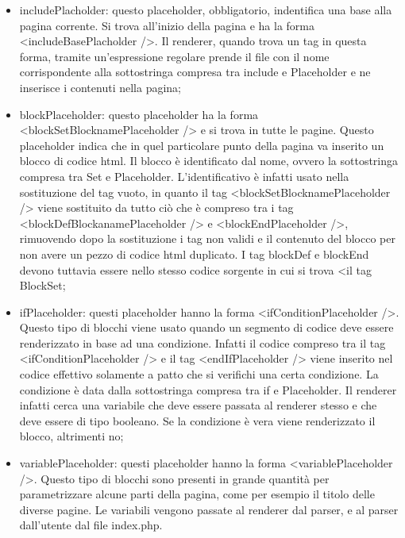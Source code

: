 \begin{itemize}
    
	\item includePlacholder: questo placeholder, obbligatorio, indentifica una base alla pagina corrente. Si trova all'inizio della pagina e ha la forma <includeBasePlacholder />. Il renderer, quando trova un tag in questa forma, tramite un'espressione
	regolare prende il file con il nome corrispondente alla sottostringa compresa tra include e Placeholder e ne inserisce i contenuti nella pagina;
	
    \item blockPlaceholder: questo placeholder ha la forma <blockSetBlocknamePlaceholder /> e si trova in tutte le pagine. Questo placeholder indica che in quel particolare punto della pagina va inserito un blocco di codice html. Il blocco è identificato dal 
	nome, ovvero la sottostringa compresa tra Set e Placeholder. L'identificativo è infatti usato nella sostituzione del tag vuoto, in quanto il tag <blockSetBlocknamePlaceholder /> viene sostituito da tutto ciò che è compreso tra i tag <blockDefBlockanamePlaceholder /> 
	e <blockEndPlaceholder />, rimuovendo dopo la sostituzione i tag non validi e il contenuto del blocco per non avere un pezzo di codice html duplicato. I tag blockDef e blockEnd devono tuttavia essere nello stesso codice 
	sorgente in cui si trova <il tag BlockSet;
	
	\item ifPlaceholder: questi placeholder hanno la forma <ifConditionPlaceholder />. Questo tipo di blocchi viene usato quando un segmento di codice deve essere renderizzato in base ad una condizione. Infatti il codice compreso tra il tag <ifConditionPlaceholder /> 
	e il tag <endIfPlaceholder /> viene inserito nel codice effettivo solamente a patto che si verifichi una certa condizione. La condizione è data dalla sottostringa compresa tra if e Placeholder. Il renderer infatti cerca una variabile che deve essere passata
	al renderer stesso e che deve essere di tipo booleano. Se la condizione è vera viene renderizzato il blocco, altrimenti no;
	
	\item variablePlaceholder: questi placeholder hanno la forma <variablePlaceholder />. Questo tipo di blocchi sono presenti in grande quantità per parametrizzare alcune parti della pagina, come per esempio il titolo delle diverse pagine. Le variabili vengono 
	passate al renderer dal parser, e al parser dall'utente dal file index.php.
	
\end{itemize}

